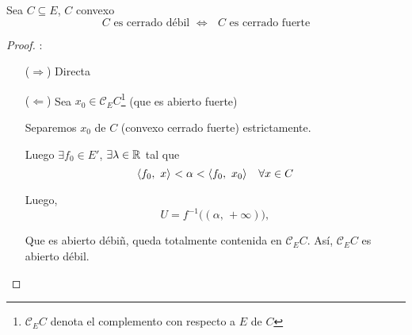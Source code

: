 \begin{thm}
Sea $C \subseteq E$, $C$ convexo
\begin{equation*}
    \text{$C$ es cerrado débil $\iff$ $C$ es cerrado fuerte}
\end{equation*}
\end{thm}

\begin{proof}:\\
\begin{itemize}
    \item[($\Rightarrow$)] Directa
    
    \item[($\Leftarrow$)] Sea $x_0\in \mathcal{C}_{E} C$\footnote{$\mathcal{C}_{E} C$ denota el complemento con respecto a $E$ de $C$} (que es abierto fuerte)
    
    Separemos $x_0$ de $C$ (convexo cerrado fuerte) estrictamente.
    
    Luego $\exists f_0 \in E'$, $\exists \lambda \in \rr$ tal que
    \begin{equation*}
        \prodint[]{f_0}{x} < \alpha < \prodint[]{f_0}{x_0} \quad \forall x \in C
    \end{equation*}
    
    Luego, 
    \begin{equation*}
        U = f^{-1}\big( (\alpha,\, + \infty) \big),
    \end{equation*}
    
    Que es abierto débiñ, queda totalmente contenida en $\mathcal{C}_E C$. Así, $\mathcal{C}_E C$ es abierto débil.
\end{itemize}
\end{proof}